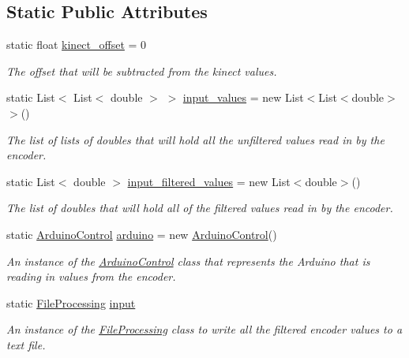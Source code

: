 \subsection*{Static Public Attributes}
\begin{DoxyCompactItemize}
\item 
static float \hyperlink{classkinect_expirement_1_1_encoder_sensor_class_a70bb049741404bcfcce7e78a43739e33}{kinect\+\_\+offset} = 0
\begin{DoxyCompactList}\small\item\em The offset that will be subtracted from the kinect values. \end{DoxyCompactList}\item 
static List$<$ List$<$ double $>$ $>$ \hyperlink{classkinect_expirement_1_1_encoder_sensor_class_a8f77045a1820ffa39d9d162a404938ff}{input\+\_\+values} = new List$<$List$<$double$>$$>$()
\begin{DoxyCompactList}\small\item\em The list of lists of doubles that will hold all the unfiltered values read in by the encoder. \end{DoxyCompactList}\item 
static List$<$ double $>$ \hyperlink{classkinect_expirement_1_1_encoder_sensor_class_a19b9e4e6fe72872dcab2c82a91470c3a}{input\+\_\+filtered\+\_\+values} = new List$<$double$>$()
\begin{DoxyCompactList}\small\item\em The list of doubles that will hold all of the filtered values read in by the encoder. \end{DoxyCompactList}\item 
static \hyperlink{classkinect_expirement_1_1_arduino_control}{Arduino\+Control} \hyperlink{classkinect_expirement_1_1_encoder_sensor_class_a5581b60b2dc6c9311ae5318772aa92f1}{arduino} = new \hyperlink{classkinect_expirement_1_1_arduino_control}{Arduino\+Control}()
\begin{DoxyCompactList}\small\item\em An instance of the {\ttfamily \hyperlink{classkinect_expirement_1_1_arduino_control}{Arduino\+Control}} class that represents the Arduino that is reading in values from the encoder. \end{DoxyCompactList}\item 
static \hyperlink{classkinect_expirement_1_1_file_processing}{File\+Processing} \hyperlink{classkinect_expirement_1_1_encoder_sensor_class_aece38a4f443111c5f0b415463d751fe4}{input}
\begin{DoxyCompactList}\small\item\em An instance of the {\ttfamily \hyperlink{classkinect_expirement_1_1_file_processing}{File\+Processing}} class to write all the filtered encoder values to a text file. \end{DoxyCompactList}\item 
$$
\end{DoxyCompactItemize}
